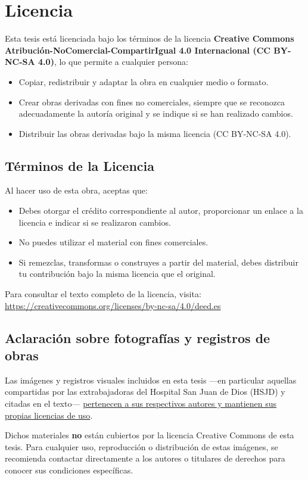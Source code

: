 \section*{Licencia}

Esta tesis está licenciada bajo los términos de la licencia \textbf{Creative Commons Atribución-NoComercial-CompartirIgual 4.0 Internacional (CC BY-NC-SA 4.0)}, lo que permite a cualquier persona:

\begin{itemize}
    \item Copiar, redistribuir y adaptar la obra en cualquier medio o formato.
    \item Crear obras derivadas con fines no comerciales, siempre que se reconozca adecuadamente la autoría original y se indique si se han realizado cambios.
    \item Distribuir las obras derivadas bajo la misma licencia (CC BY-NC-SA 4.0).
\end{itemize}

\subsection*{Términos de la Licencia}

Al hacer uso de esta obra, aceptas que:

\begin{itemize}
    \item Debes otorgar el crédito correspondiente al autor, proporcionar un enlace a la licencia e indicar si se realizaron cambios.
    \item No puedes utilizar el material con fines comerciales.
    \item Si remezclas, transformas o construyes a partir del material, debes distribuir tu contribución bajo la misma licencia que el original.
\end{itemize}

Para consultar el texto completo de la licencia, visita: 
\url{https://creativecommons.org/licenses/by-nc-sa/4.0/deed.es}

\subsection*{Aclaración sobre fotografías y registros de obras}

Las imágenes y registros visuales incluidos en esta tesis —en particular aquellas compartidas por las extrabajadoras del Hospital San Juan de Dios (HSJD) y citadas en el texto— \underline{pertenecen a sus respectivos autores y mantienen sus propias licencias de uso}.

Dichos materiales \textbf{no} están cubiertos por la licencia Creative Commons de esta tesis. Para cualquier uso, reproducción o distribución de estas imágenes, se recomienda contactar directamente a los autores o titulares de derechos para conocer sus condiciones específicas.

